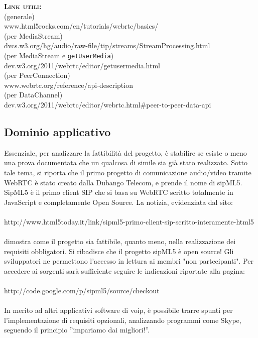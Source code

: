 \begin{description}
	\item{\scshape\bfseries Link utili:}\\
  (generale)\\
  www.html5rocks.com/en/tutorials/webrtc/basics/\\
  (per MediaStream)\\
  dvcs.w3.org/hg/audio/raw-file/tip/streams/StreamProcessing.html\\
  (per MediaStream e \texttt{getUserMedia})\\
  dev.w3.org/2011/webrtc/editor/getusermedia.html\\
  (per PeerConnection)\\
  www.webrtc.org/reference/api-description\\
  (per DataChannel)\\
  dev.w3.org/2011/webrtc/editor/webrtc.html\#peer-to-peer-data-api\\
\end{description}

\subsection{Dominio applicativo}
Essenziale, per analizzare la fattibilità del progetto, è stabilire se esiste o meno una prova documentata che un qualcosa di simile sia già stato realizzato. Sotto tale tema, si riporta che il primo progetto di comunicazione audio/video tramite WebRTC è stato creato dalla Dubango Telecom, e prende il nome di sipML5. SipML5 è il primo client SIP che si basa su WebRTC scritto totalmente in JavaScript e completamente Open Source. La notizia, evidenziata dal sito:\\\\ http://www.html5today.it/link/sipml5-primo-client-sip-scritto-interamente-html5\\\\ dimostra come il progetto sia fattibile, quanto meno, nella realizzazione dei requisiti obbligatori. Si ribadisce che il progetto sipML5 è open source! Gli sviluppatori ne permettono l'accesso in lettura ai membri "non partecipanti". Per accedere ai sorgenti sarà sufficiente seguire le indicazioni riportate alla pagina:\\\\ http://code.google.com/p/sipml5/source/checkout\\\\ In merito ad altri applicativi software di voip, è possibile trarre spunti per l'implementazione di requisiti opzionali, analizzando programmi come Skype, seguendo il principio ''impariamo dai migliori!''.

